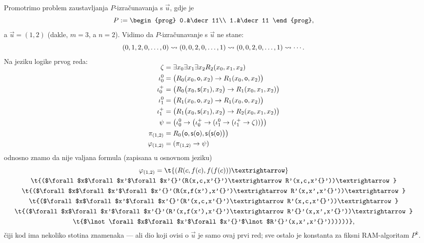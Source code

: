 \begin{primjer}[{name=[zaustavljanje RAM-izračunavanja kao valjanost jedne formule]}]
Promotrimo problem zaustavljanja $P$-izračunavanja s $\vec u$, gdje je
\begin{equation}
    P:=\begin{prog}
    0.&\decr11\\
    1.&\decr11
    \end{prog}\text,
\end{equation}
    a $\vec u=(1,2)$ (dakle, $m=3$, a $n=2$). Vidimo da $P$-izračunavanje s $\vec u$ ne stane:
\begin{equation}
    (0,1,2,0,\dotsc,0)\leadsto(0,0,2,0,\dotsc,1)\leadsto(0,0,2,0,\dotsc,1)\leadsto\dotsb\text.
\end{equation}
Na jeziku logike prvog reda:
\begin{align}
\SwapAboveDisplaySkip
    \zeta&=\exists x_0\exists x_1\exists x_2 R_2(x_0,x_1,x_2)\\
    \iota_0^0&=\bigl(R_0(x_0,\mathsf o,x_2)\to R_1(x_0,\mathsf o,x_2)\bigr)\\
    \iota_0^+&=\bigl(R_0\bigl(x_0,\mathsf s(x_1),x_2\bigr)\to R_1(x_0,x_1,x_2)\bigr)\\
    \iota_1^0&=\bigl(R_1(x_0,\mathsf o,x_2)\to R_1(x_0,\mathsf o,x_2)\bigr)\\
    \iota_1^+&=\bigl(R_1\bigl(x_0,\mathsf s(x_1),x_2\bigr)\to R_2(x_0,x_1,x_2)\bigr)\\
    \psi&=\bigl(\iota_0^0\to\bigl(\iota_0^+\to(\iota_1^0\to(\iota_1^+\to\zeta))\bigl)\bigl)\\
    \pi_{(1,2)}&=R_0\bigl(\mathsf o,\mathsf s(\mathsf o),\mathsf s\bigl(\mathsf s(\mathsf o)\bigr)\bigr)\\
    \varphi_{(1,2)}&=(\pi_{(1,2)}\to\psi)
\end{align}
    odnosno znamo da nije valjana formula (zapisana u osnovnom jeziku)
\begin{multline}
    \varphi_{(1,2)}=\t{(R(c,f(c),f(f(c)))\textrightarrow}\\
    \t{($\forall$x$\forall$x'$\forall$x'{}'(R(x,c,x'{}')\textrightarrow R'(x,c,x'{}'))\textrightarrow}\\
    \t{($\forall$x$\forall$x'$\forall$x'{}'(R(x,f(x'),x'{}')\textrightarrow R'(x,x',x'{}'))\textrightarrow}\\
    \t{($\forall$x$\forall$x'$\forall$x'{}'(R'(x,c,x'{}')\textrightarrow R'(x,c,x'{}'))\textrightarrow}\\
    \t{($\forall$x$\forall$x'$\forall$x'{}'(R'(x,f(x'),x'{}')\textrightarrow R'{}'(x,x',x'{}'))\textrightarrow}\\
    \t{$\lnot\forall$x$\forall$x'$\forall$x'{}'$\lnot$R'{}'(x,x',x'{}'))))))}\text,
\end{multline}
čiji kod ima nekoliko stotina znamenaka --- ali dio koji ovisi o $\vec u$ je samo ovaj prvi red; sve ostalo je konstanta za fiksni RAM-algoritam $P^k$.
\end{primjer}

